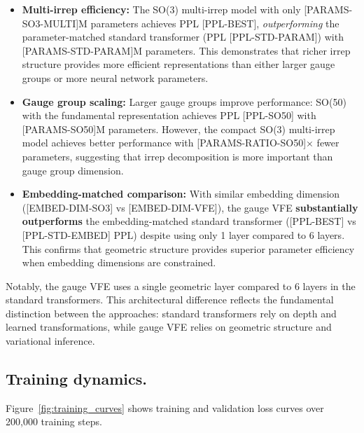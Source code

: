 \documentclass[twoside,11pt]{article}
\begin{document}
\begin{itemize}
  \item \textbf{Multi-irrep efficiency:} The SO(3) multi-irrep model with only [PARAMS-SO3-MULTI]M parameters achieves PPL [PPL-BEST], \emph{outperforming} the parameter-matched standard transformer (PPL [PPL-STD-PARAM]) with [PARAMS-STD-PARAM]M parameters. This demonstrates that richer irrep structure provides more efficient representations than either larger gauge groups or more neural network parameters.

  \item \textbf{Gauge group scaling:} Larger gauge groups improve performance: SO(50) with the fundamental representation achieves PPL [PPL-SO50] with [PARAMS-SO50]M parameters. However, the compact SO(3) multi-irrep model achieves better performance with [PARAMS-RATIO-SO50]$\times$ fewer parameters, suggesting that irrep decomposition is more important than gauge group dimension.

  \item \textbf{Embedding-matched comparison:} With similar embedding dimension ([EMBED-DIM-SO3] vs [EMBED-DIM-VFE]), the gauge VFE \textbf{substantially outperforms} the embedding-matched standard transformer ([PPL-BEST] vs [PPL-STD-EMBED] PPL) despite using only 1 layer compared to 6 layers. This confirms that geometric structure provides superior parameter efficiency when embedding dimensions are constrained.
\end{itemize}

Notably, the gauge VFE uses a single geometric layer compared to 6 layers in the standard transformers. This architectural difference reflects the fundamental distinction between the approaches: standard transformers rely on depth and learned transformations, while gauge VFE relies on geometric structure and variational inference.

\subsection{Training dynamics.}

Figure~\ref{fig:training_curves} shows training and validation loss curves over 200,000 training steps.
\end{document}
